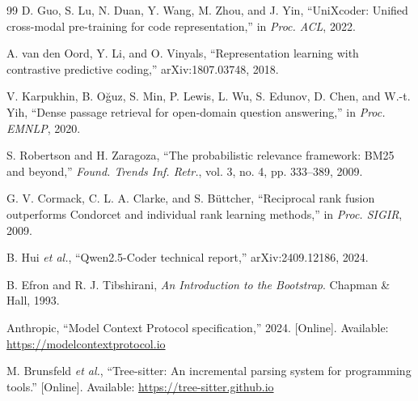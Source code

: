\begin{thebibliography}{99}
 D. Guo, S. Lu, N. Duan, Y. Wang, M. Zhou, and J. Yin, ``UniXcoder: Unified cross-modal pre-training for code representation,'' in \emph{Proc. ACL}, 2022.

 A. van den Oord, Y. Li, and O. Vinyals, ``Representation learning with contrastive predictive coding,'' arXiv:1807.03748, 2018.

 V. Karpukhin, B. O\u{g}uz, S. Min, P. Lewis, L. Wu, S. Edunov, D. Chen, and W.-t. Yih, ``Dense passage retrieval for open-domain question answering,'' in \emph{Proc. EMNLP}, 2020.

 S. Robertson and H. Zaragoza, ``The probabilistic relevance framework: BM25 and beyond,'' \emph{Found. Trends Inf. Retr.}, vol. 3, no. 4, pp. 333--389, 2009.

 G. V. Cormack, C. L. A. Clarke, and S. B\"uttcher, ``Reciprocal rank fusion outperforms Condorcet and individual rank learning methods,'' in \emph{Proc. SIGIR}, 2009.

 B. Hui \emph{et al.}, ``Qwen2.5-Coder technical report,'' arXiv:2409.12186, 2024.

 B. Efron and R. J. Tibshirani, \emph{An Introduction to the Bootstrap}. Chapman \& Hall, 1993.

 Anthropic, ``Model Context Protocol specification,'' 2024. [Online]. Available: \url{https://modelcontextprotocol.io}

 M. Brunsfeld \emph{et al.}, ``Tree-sitter: An incremental parsing system for programming tools.'' [Online]. Available: \url{https://tree-sitter.github.io}

\end{thebibliography}
